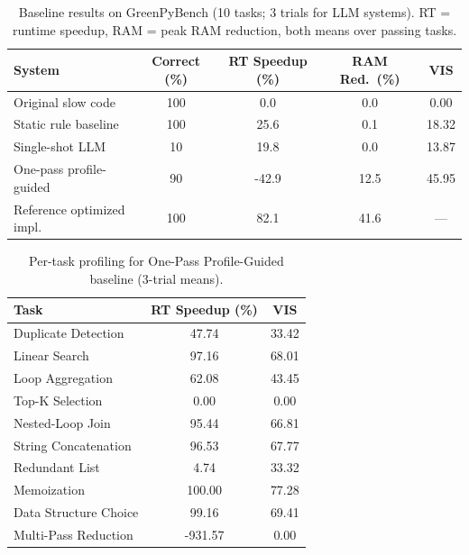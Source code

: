 \documentclass{article}
\begin{document}
\begin{table}[h]
\centering
\caption{Baseline results on GreenPyBench (10 tasks; 3 trials for LLM systems). RT = runtime speedup, RAM = peak RAM reduction, both means over passing tasks.}
\label{tab:baseline}
\small
\begin{tabular}{lcccc}
\toprule
\textbf{System} & \textbf{Correct (\%)} & \textbf{RT Speedup (\%)} & \textbf{RAM Red.\ (\%)} & \textbf{VIS} \\
\midrule
Original slow code        & 100 & 0.0  & 0.0  & 0.00 \\
Static rule baseline      & 100 & 25.6 & 0.1  & 18.32 \\
Single-shot LLM           & 10 & 19.8  & 0.0  & 13.87 \\
One-pass profile-guided   & 90 & -42.9 & 12.5 & 45.95 \\
Reference optimized impl. & 100 & 82.1 & 41.6 & --- \\
\bottomrule
\end{tabular}
\end{table}

\begin{table}[h]
\centering
\caption{Per-task profiling for One-Pass Profile-Guided baseline (3-trial means).}
\label{tab:onepass_pertask}
\small
\begin{tabular}{lcc}
\toprule
\textbf{Task} & \textbf{RT Speedup (\%)} & \textbf{VIS} \\
\midrule
Duplicate Detection   & 47.74 & 33.42 \\
Linear Search         & 97.16 & 68.01 \\
Loop Aggregation      & 62.08 & 43.45 \\
Top-K Selection       & 0.00  & 0.00 \\
Nested-Loop Join      & 95.44 & 66.81 \\
String Concatenation  & 96.53 & 67.77 \\
Redundant List        & 4.74  & 33.32 \\
Memoization           & 100.00 & 77.28 \\
Data Structure Choice & 99.16 & 69.41 \\
Multi-Pass Reduction  & -931.57 & 0.00 \\
\bottomrule
\end{tabular}
\end{table}
\end{document}
